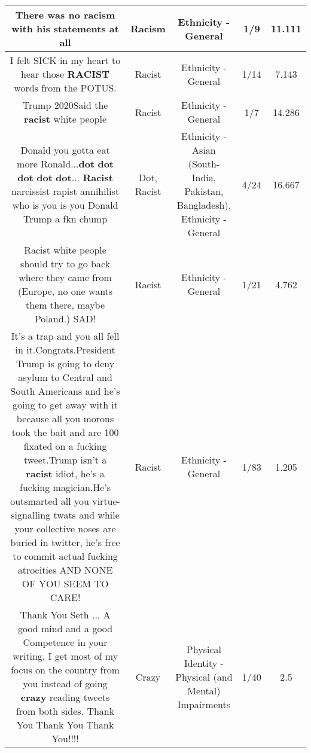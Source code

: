 \documentclass[11pt]{article}
\newlength\mylength
\begin{document}
\begin{center}
\begin{longtable}{|C{.65\mylength}|C{.30\mylength}|C{.12\mylength}|C{.12\mylength}|C{.12\mylength}|}
  \small There was no \textbf{racism} with his statements at all\normalsize   & Racism & Ethnicity - General & 1/9 & 11.111 \\  \hline
  \small I felt SICK in my heart to hear those \textbf{RACIST} words from the POTUS.\normalsize   & Racist & Ethnicity - General & 1/14 & 7.143 \\  \hline
  \small Trump 2020Said the \textbf{racist} white people\normalsize   & Racist & Ethnicity - General & 1/7 & 14.286 \\  \hline
  \small Donald you gotta eat more Ronald...\textbf{dot} \textbf{dot} \textbf{dot} \textbf{dot} \textbf{dot}... \textbf{Racist} narcissist rapist annihilist who is you is you Donald Trump a fkn chump\normalsize   & Dot, Racist & Ethnicity - Asian (South- India, Pakistan, Bangladesh), Ethnicity - General & 4/24 & 16.667 \\  \hline
  \small Racist white people should try to go back where they came from (Europe, no one wants them there, maybe Poland.) SAD!\normalsize   & Racist & Ethnicity - General & 1/21 & 4.762 \\  \hline
  \small It's a trap and you all fell in it.Congrats.President Trump is going to deny asylum to Central and South Americans and he's going to get away with it because all you morons took the bait and are 100 fixated on a fucking tweet.Trump isn't a \textbf{racist} idiot, he's a fucking magician.He's outsmarted all you virtue-signalling twats and while your collective noses are buried in twitter, he's free to commit actual fucking atrocities AND NONE OF YOU SEEM TO CARE!\normalsize   & Racist & Ethnicity - General & 1/83 & 1.205 \\  \hline
  \small Thank You Seth ... A good mind and a good Competence in your writing, I get most of my focus on the country from you instead of going \textbf{crazy} reading tweets from both sides. Thank You Thank You Thank You!!!!\normalsize   & Crazy & Physical Identity - Physical (and Mental) Impairments & 1/40 & 2.5 \\  \hline

\end{longtable}
\end{center}
\end{document}
